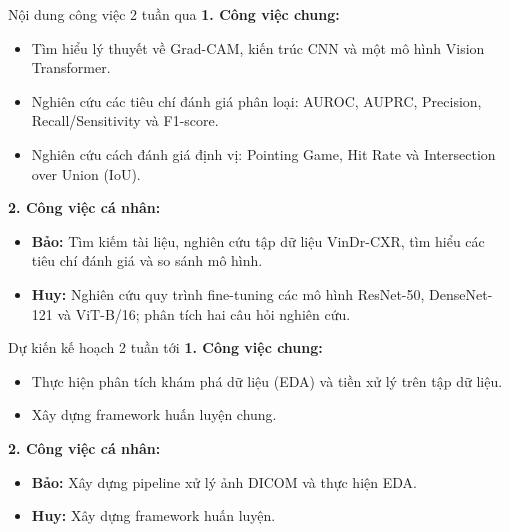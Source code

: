 \documentclass[10pt]{beamer}
\begin{document}
\begin{frame}{Nội dung công việc 2 tuần qua}
    \textbf{1. Công việc chung:}
    \begin{itemize}
        \item Tìm hiểu lý thuyết về Grad-CAM, kiến trúc CNN và một mô hình Vision Transformer.
        \item Nghiên cứu các tiêu chí đánh giá phân loại: AUROC, AUPRC, Precision, Recall/Sensitivity và F1-score.
        \item Nghiên cứu cách đánh giá định vị: Pointing Game, Hit Rate và Intersection over Union (IoU).
    \end{itemize}
    \vspace{0.3cm}

    \textbf{2. Công việc cá nhân:}
    \begin{itemize}
        \item \textbf{Bảo:} Tìm kiếm tài liệu, nghiên cứu tập dữ liệu VinDr-CXR, tìm hiểu các tiêu chí đánh giá và so sánh mô hình.
        \item \textbf{Huy:} Nghiên cứu quy trình fine-tuning các mô hình ResNet-50, DenseNet-121 và ViT-B/16; phân tích hai câu hỏi nghiên cứu.
    \end{itemize}
\end{frame}

\begin{frame}{Dự kiến kế hoạch 2 tuần tới}
    \textbf{1. Công việc chung:}
    \begin{itemize}
        \item Thực hiện phân tích khám phá dữ liệu (EDA) và tiền xử lý trên tập dữ liệu.
        \item Xây dựng framework huấn luyện chung.
    \end{itemize}
    \vspace{0.3cm}

    \textbf{2. Công việc cá nhân:}
    \begin{itemize}
        \item \textbf{Bảo:} Xây dựng pipeline xử lý ảnh DICOM và thực hiện EDA.
        \item \textbf{Huy:} Xây dựng framework huấn luyện.
    \end{itemize}
\end{frame}
\end{document}
